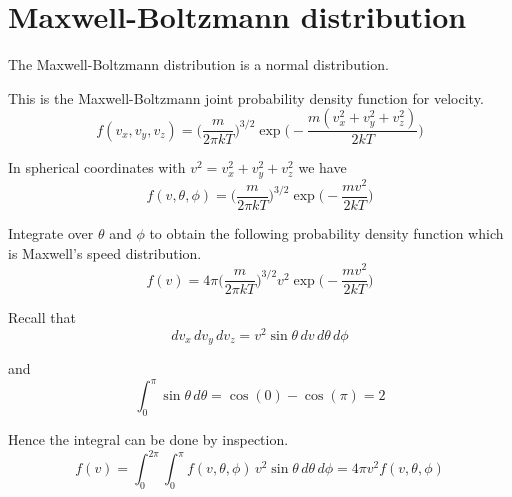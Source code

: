 \documentclass[12pt]{article}
\begin{document}
\section*{Maxwell-Boltzmann distribution}

The Maxwell-Boltzmann distribution is a normal distribution.

\bigskip
This is the Maxwell-Boltzmann joint probability density function for velocity.
\begin{equation*}
f(v_x,v_y,v_z)=
\biggl(\frac{m}{2\pi kT}\biggr)^{3/2}
\exp\biggl(-\frac{m(v_x^2+v_y^2+v_z^2)}{2kT}\biggr)
\end{equation*}

In spherical coordinates with $v^2=v_x^2+v_y^2+v_z^2$ we have
\begin{equation*}
f(v,\theta,\phi)=
\biggl(\frac{m}{2\pi kT}\biggr)^{3/2}
\exp\biggl(-\frac{mv^2}{2kT}\biggr)
\end{equation*}

Integrate over $\theta$ and $\phi$
to obtain the following probability density function
which is Maxwell's speed distribution.
\begin{equation*}
f(v)=4\pi\biggl(\frac{m}{2\pi kT}\biggr)^{3/2}
v^2\exp\biggl(-\frac{mv^2}{2kT}\biggr)
\end{equation*}

Recall that
\begin{equation*}
dv_x\,dv_y\,dv_z=v^2\sin\theta\,dv\,d\theta\,d\phi
\end{equation*}

and
\begin{equation*}
\int_0^\pi\sin\theta\,d\theta=\cos(0)-\cos(\pi)=2
\end{equation*}

Hence the integral can be done by inspection.
\begin{equation*}
f(v)=\int_0^{2\pi}\int_0^\pi f(v,\theta,\phi)\,v^2\sin\theta\,d\theta\,d\phi
=4\pi v^2f(v,\theta,\phi)
\end{equation*}

\end{document}
